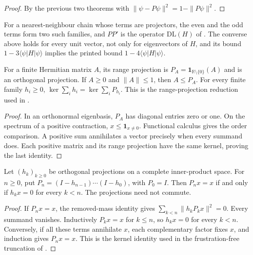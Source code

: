 \begin{proof}
    \leanok
    By the previous two theorems with $\|\psi-P\psi\|^2=1-\|P\psi\|^2$.
\end{proof}

For a nearest-neighbour chain whose terms are projectors, the even and the
odd terms form two such families, and $PP'$ is the operator $\mathrm{DL}(H)$ of
\cite[Definition def:DLO]{Arad2016RigorousRG}. The converse above holds for
every unit vector, not only for eigenvectors of $H$, and its bound
$1-3\langle\psi|H|\psi\rangle$ implies the printed bound
$1-4\langle\psi|H|\psi\rangle$.

\begin{theorem}
    \label{thm:support_projection_order_kernel}
    \leanok
    For a finite Hermitian matrix $A$, its range projection is
    $P_A=\mathbf1_{\mathbb R\setminus\{0\}}(A)$ and is an orthogonal projection.
    If $A\ge0$ and $\|A\|\le1$, then $A\le P_A$.
    For every finite family $h_i\ge0$,
    $\ker\sum_i h_i=\ker\sum_i P_{h_i}$.
    This is the range-projection reduction used in
    \cite[Section 6.1]{Arad2016RigorousRG}.
\end{theorem}
\begin{proof}\leanok
    In an orthonormal eigenbasis, $P_A$ has diagonal entries zero or one.
    On the spectrum of a positive contraction, $x\le\mathbf1_{x\ne0}$.
    Functional calculus gives the order comparison. A positive sum annihilates
    a vector precisely when every summand does. Each positive matrix and its
    range projection have the same kernel, proving the last identity.
\end{proof}

\begin{theorem}
    \label{thm:complement_product_common_kernel}
    \leanok
    Let $(h_k)_{k\ge0}$ be orthogonal projections on a complete inner-product
    space. For $n\ge0$, put $P_n=(I-h_{n-1})\cdots(I-h_0)$, with $P_0=I$.
    Then $P_nx=x$ if and only if $h_kx=0$ for every $k<n$.
    The projections need not commute.
\end{theorem}
\begin{proof}\leanok
    If $P_nx=x$, the removed-mass identity gives
    $\sum_{k<n}\|h_kP_kx\|^2=0$. Every summand vanishes. Inductively
    $P_kx=x$ for $k\le n$, so $h_kx=0$ for every $k<n$.
    Conversely, if all these terms annihilate $x$, each complementary
    factor fixes $x$, and induction gives $P_nx=x$.
    This is the kernel identity used in the frustration-free truncation
    of \cite{Arad2016RigorousRG}.
\end{proof}

